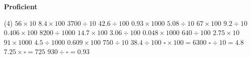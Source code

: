 \documentclass[17pt,a4paper,landscape]{extarticle}
\begin{document}
\sffamily
\boldmath

\boldmath

\boldmath

\boldmath

\vspace*{0.4em}
{\LARGE \textbf{Proficient}}
\begin{tasks}(4)
\task \mbox{$56 \times 10$}
\task \mbox{$8.4 \times 100$}
\task \mbox{$3700 \div 10$}
\task \mbox{$42.6 \div 100$}
\task \mbox{$0.93 \times 1000$}
\task \mbox{$5.08 \div 10$}
\task \mbox{$67 \times 100$}
\task \mbox{$9.2 \div 10$}
\task \mbox{$0.406 \times 100$}
\task \mbox{$8200 \div 1000$}
\task \mbox{$14.7 \times 100$}
\task \mbox{$3.06 \div 100$}
\task \mbox{$0.048 \times 1000$}
\task \mbox{$640 \div 100$}
\task \mbox{$2.75 \times 10$}
\task \mbox{$91 \times 1000$}
\task \mbox{$4.5 \div 1000$}
\task \mbox{$0.609 \times 100$}
\task \mbox{$750 \div 10$}
\task \mbox{$38.4 \div 100$}
\task \mbox{$\square \times 100 = 6300$}
\task \mbox{$\square \div 10 = 4.8$}
\task \mbox{$7.25 \times \square = 725$}
\task \mbox{$930 \div \square = 0.93$}
\end{tasks}
\end{document}
